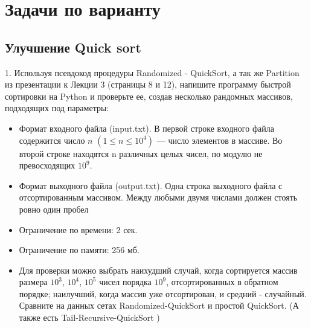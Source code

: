 \section{Задачи по варианту}

\subsection{Улучшение Quick sort}
1. Используя псевдокод процедуры Randomized - QuickSort, а так же Partition из презентации к Лекции 3 (страницы 8 и 12), напишите программу быстрой сортировки на Python и проверьте ее, создав несколько рандомных массивов, подходящих под параметры:
\begin{itemize}
	\item Формат входного файла (input.txt). В первой строке входного файла
    содержится число $n$ $(1 \le n \le 10^4)$ — число элементов в массиве.
    Во второй строке находятся n различных целых чисел, по модулю не
    превосходящих $10^9$.
	\item Формат выходного файла (output.txt). Одна строка выходного файла
    с отсортированным массивом. Между любыми двумя числами должен
    стоять ровно один пробел
	\item Ограничение по времени: 2 сек.
        \item Ограничение по памяти: 256 мб.
        \item Для проверки можно выбрать наихудший случай, когда сортируется
    массив размера $10^3$, $10^4$, $10^5$ чисел порядка $10^9$, отсортированных в обратном порядке; наилучший, когда массив уже отсортирован, и средний
    - случайный. Сравните на данных сетах Randomized-QuickSort и простой QuickSort. (А также есть Tail-Recursive-QuickSort \cite{book})

\end{itemize}

